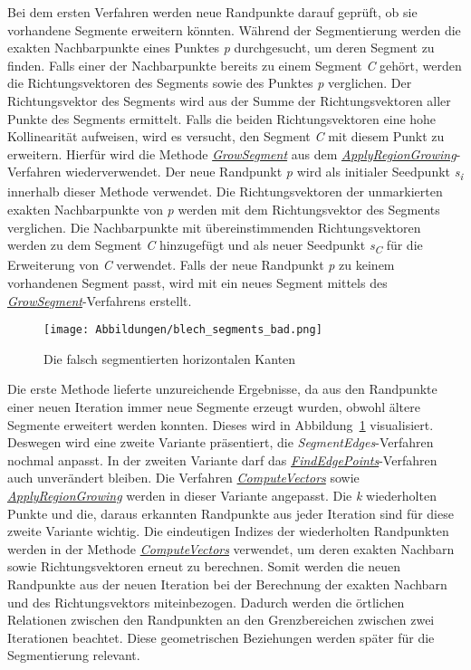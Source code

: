 Bei dem ersten Verfahren werden neue Randpunkte darauf geprüft, ob sie vorhandene Segmente erweitern könnten. Während der Segmentierung werden die exakten Nachbarpunkte eines Punktes \textit{p} durchgesucht, um deren Segment zu finden. Falls einer der Nachbarpunkte bereits zu einem Segment \textit{C} gehört, werden die Richtungsvektoren des Segments sowie des Punktes \textit{p} verglichen. Der Richtungsvektor des Segments wird aus der Summe der Richtungsvektoren aller Punkte des Segments ermittelt. Falls die beiden Richtungsvektoren eine hohe Kollinearität aufweisen, wird es versucht, den Segment \textit{C} mit diesem Punkt zu erweitern. Hierfür wird die Methode \textit{\hyperref[alg:grow_segment]{GrowSegment}} aus dem \textit{\hyperref[alg:apply_region_growing]{ApplyRegionGrowing}}-Verfahren wiederverwendet. Der neue Randpunkt \textit{p} wird als initialer Seedpunkt \textit{s\textsubscript{i}} innerhalb dieser Methode verwendet. Die Richtungsvektoren der unmarkierten exakten Nachbarpunkte von \textit{p} werden mit dem Richtungsvektor des Segments verglichen. Die Nachbarpunkte mit übereinstimmenden Richtungsvektoren werden zu dem Segment \textit{C} hinzugefügt und als neuer Seedpunkt \textit{s\textsubscript{C}} für die Erweiterung von \textit{C} verwendet. Falls der neue Randpunkt \textit{p} zu keinem vorhandenen Segment passt, wird mit ein neues Segment mittels des \textit{\hyperref[alg:grow_segment]{GrowSegment}}-Verfahrens erstellt.

\begin{figure}[b!]
	\texttt{[image: Abbildungen/blech\_segments\_bad.png]}
	\centering
	\caption[Falsche Segmente]{Die falsch segmentierten horizontalen Kanten}
	\label{fig: bad_segments}
\end{figure}

Die erste Methode lieferte unzureichende Ergebnisse, da aus den Randpunkte einer neuen Iteration immer neue Segmente erzeugt wurden, obwohl ältere Segmente erweitert werden konnten. Dieses wird in Abbildung~\ref{fig: bad_segments} visualisiert. Deswegen wird eine zweite Variante präsentiert, die \textit{SegmentEdges}-Verfahren nochmal anpasst. In der zweiten Variante darf das \textit{\hyperref[alg:find_edge_points]{FindEdgePoints}}-Verfahren auch unverändert bleiben. Die Verfahren \textit{\hyperref[alg:compute_vectors]{ComputeVectors}} sowie \textit{\hyperref[alg:apply_region_growing]{ApplyRegionGrowing}} werden in dieser Variante angepasst. Die \textit{k} wiederholten Punkte und die, daraus erkannten Randpunkte aus jeder Iteration sind für diese zweite Variante wichtig. Die eindeutigen Indizes der wiederholten Randpunkten werden in der Methode \textit{\hyperref[alg:compute_vectors]{ComputeVectors}} verwendet, um deren exakten Nachbarn sowie Richtungsvektoren erneut zu berechnen. Somit werden die neuen Randpunkte aus der neuen Iteration bei der Berechnung der exakten Nachbarn und des Richtungsvektors miteinbezogen. Dadurch werden die örtlichen Relationen zwischen den Randpunkten an den Grenzbereichen zwischen zwei Iterationen beachtet. Diese geometrischen Beziehungen werden später für die Segmentierung relevant.

